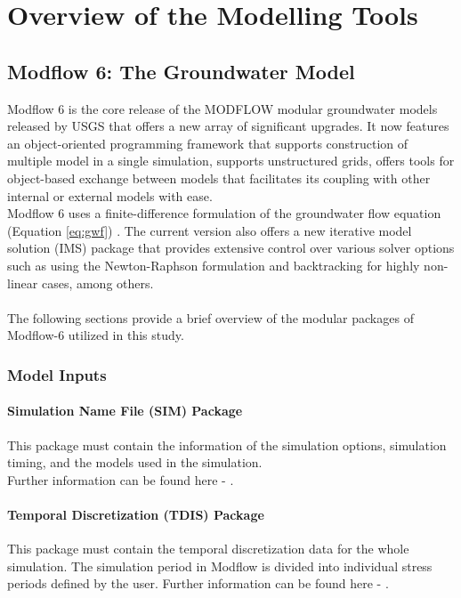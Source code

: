 \chapter{Overview of the Modelling Tools}
\label{models}

\section{Modflow 6: The Groundwater Model}
\label{mf6}
Modflow 6 is the  core release of the MODFLOW modular groundwater models released by USGS that offers a new array of significant upgrades. It now features an object-oriented programming framework \cite{Hughes2017} that supports construction of multiple model in a single simulation, supports unstructured grids, offers tools for object-based exchange between models that facilitates its coupling with other internal or external models with ease.
\\
Modflow 6 uses a finite-difference formulation of the groundwater flow equation (Equation \ref{eq:gwf}) \cite{Langevin2017}. The current version also offers a new iterative model solution (IMS) package that provides extensive control over various solver options such as using the Newton-Raphson formulation and backtracking for highly non-linear cases, among others.
\\ \\
The following sections provide a brief overview of the modular packages of Modflow-6 utilized in this study.

\subsection{Model Inputs}
\subsubsection*{Simulation Name File (SIM) Package}
This package must contain the information of the simulation options, simulation timing, and the models used in the simulation.
\\
Further information can be found here - \cite[p.~6]{USGS2018}.

\subsubsection*{Temporal Discretization (TDIS) Package}
This package must contain the temporal discretization data for the whole simulation. The simulation period in Modflow is divided into individual stress periods defined by the user.
Further information can be found here - \cite[p.~9]{USGS2018}.

